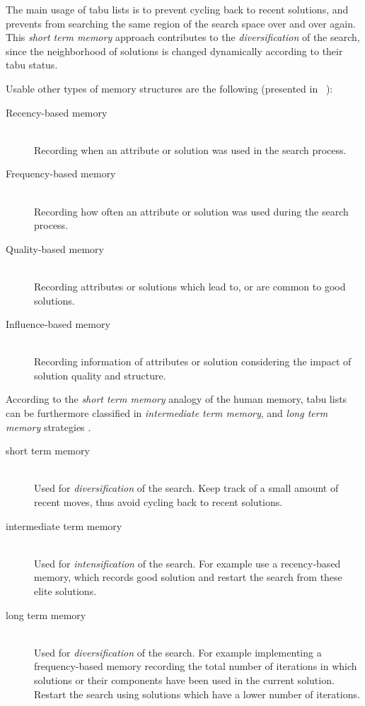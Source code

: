 The main usage of tabu lists is to prevent cycling back to recent solutions, and prevents from searching the same region of the search space over and over again. 
This \emph{short term memory} approach contributes to the \emph{diversification} of the search, since the neighborhood of solutions is changed dynamically according to their tabu status. 

Usable other types of memory structures are the following (presented in ~\cite{glover1997tabu}):  
\begin{description}
\item[Recency-based memory]\hfill \\
Recording when an attribute or solution was used in the search process.
\item[Frequency-based memory]\hfill \\
Recording how often an attribute or solution was used during the search process. 
\item[Quality-based memory]\hfill \\
Recording attributes or solutions which lead to, or are common to good solutions.
\item[Influence-based memory]\hfill \\
Recording information of attributes or solution considering the impact of solution quality and structure.
\end{description}

According to the \emph{short term memory} analogy of the human memory, tabu lists can be furthermore classified in \emph{intermediate term memory}, and \emph{long term memory} strategies \cite{gendreau2003tabusearch}.
\begin{description}
\item[short term memory]\hfill \\
Used for \emph{diversification} of the search. Keep track of a small amount of recent moves, thus avoid cycling back to recent solutions. 
\item[intermediate term memory]\hfill \\
Used for \emph{intensification} of the search. For example use a recency-based memory, which records good solution and restart the search from these elite solutions.
\item[long term memory]\hfill \\
Used for \emph{diversification} of the search. For example implementing a frequency-based memory recording the total number of iterations in which solutions or their components have been used in the current solution. Restart the search using solutions which have a lower number of iterations.
\end{description}


